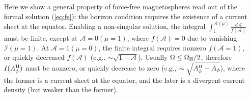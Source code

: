 \documentclass[iop,apj]{emulateapj}
\def\WH{\Omega_{\rm H}}
\def\AB{A_\phi^{\rm H}}
\begin{document}
Here we show a general property of force-free magnetospheres read out of the formal solution (\ref{eq:fs}):
the horizon condition requires the existence of a current sheet at the equator.
Enabling a non-singular solution, the integral $\int_1^{\mathcal A(\mu)}\frac{d\mathcal A}{f(\mathcal A)}$
must be finite, except at $\mathcal A = 0 (\mu = 1)$, where $f(\mathcal A) = 0$ due to vanishing $\mathcal I(\mu=1)$.
At $\mathcal A = 1 (\mu = 0)$, the finite integral requires nonzero $f(\mathcal A =1)$,
or quickly decreased $f(\mathcal A)$ (e.g., $\sim\sqrt{1-\mathcal A}$).
Usually $\Omega \leq \WH/2$, therefore $I(\AB)$ must be nonzero,
or quickly decrease to zero  (e.g., $\sim\sqrt{\AB-A_\phi}$), where the former is a current sheet at the equator,
and the later is a divergent current density (but weaker than the former).
\end{document}
